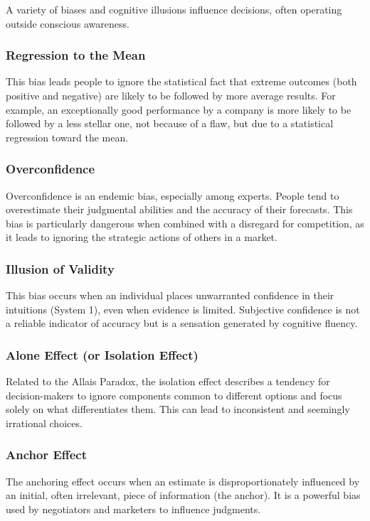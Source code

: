 \documentclass{article}
\begin{document}
A variety of biases and cognitive illusions influence decisions, often operating outside conscious awareness.
\subsubsection*{Regression to the Mean}
This bias leads people to ignore the statistical fact that extreme outcomes (both positive and negative) are likely to be followed by more average results. For example, an exceptionally good performance by a company is more likely to be followed by a less stellar one, not because of a flaw, but due to a statistical regression toward the mean.

\subsubsection*{Overconfidence}
Overconfidence is an endemic bias, especially among experts. People tend to overestimate their judgmental abilities and the accuracy of their forecasts. This bias is particularly dangerous when combined with a disregard for competition, as it leads to ignoring the strategic actions of others in a market.

\subsubsection*{Illusion of Validity}
This bias occurs when an individual places unwarranted confidence in their intuitions (System 1), even when evidence is limited. Subjective confidence is not a reliable indicator of accuracy but is a sensation generated by cognitive fluency.

\subsubsection*{Alone Effect (or Isolation Effect)}
Related to the Allais Paradox, the isolation effect describes a tendency for decision-makers to ignore components common to different options and focus solely on what differentiates them. This can lead to inconsistent and seemingly irrational choices.

\subsubsection*{Anchor Effect}
The anchoring effect occurs when an estimate is disproportionately influenced by an initial, often irrelevant, piece of information (the anchor). It is a powerful bias used by negotiators and marketers to influence judgments.
\end{document}
